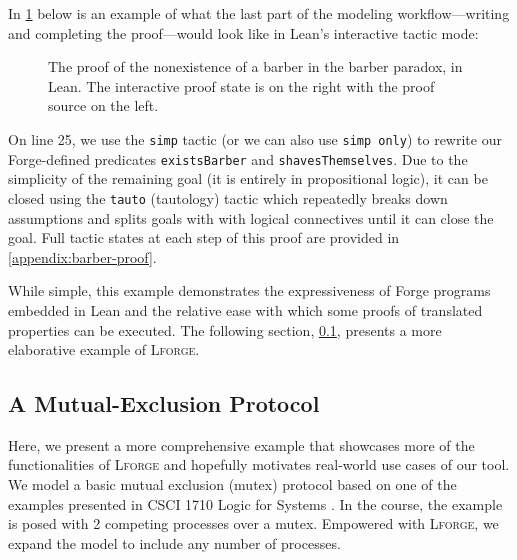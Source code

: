 In \cref{fig:barber-proof} below is an example of what the last part of the modeling workflow---writing and completing the proof---would look like in Lean's interactive tactic mode: 

\begin{figure}[h!]
  \centering
  \caption{The proof of the nonexistence of a barber in the barber paradox, in Lean. The interactive proof state is on the right with the proof source on the left. }
  \label{fig:barber-proof}
\end{figure}

On line 25, we use the \texttt{simp} tactic (or we can also use \texttt{simp only}) to rewrite our Forge-defined predicates \texttt{existsBarber} and \texttt{shavesThemselves}. Due to the simplicity of the remaining goal (it is entirely in propositional logic), it can be closed using the \texttt{tauto} (tautology) tactic which repeatedly breaks down assumptions and splits goals with with logical connectives until it can close the goal. Full tactic states at each step of this proof are provided in \cref{appendix:barber-proof}. 

While simple, this example demonstrates the expressiveness of Forge programs embedded in Lean and the relative ease with which some proofs of translated properties can be executed. The following section, \cref{sec:mutex}, presents a more elaborative example of \textsc{Lforge}.

\subsection{A Mutual-Exclusion Protocol}\label{sec:mutex}

Here, we present a more comprehensive example that showcases more of the functionalities of \textsc{Lforge} and hopefully motivates real-world use cases of our tool. We model a basic mutual exclusion (mutex) protocol based on one of the examples presented in CSCI 1710 Logic for Systems \cite{l4s}. In the course, the example is posed with 2 competing processes over a mutex. Empowered with \textsc{Lforge}, we expand the model to include any number of processes. 

